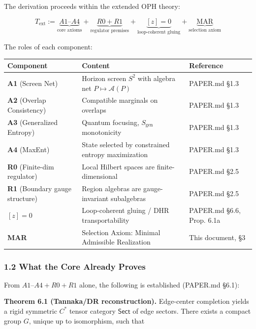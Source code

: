 The derivation proceeds within the extended OPH theory:

\[T_{\mathrm{ext}} := \underbrace{A1\text{–}A4}_{\text{core axioms}} + \underbrace{R0 + R1}_{\text{regulator premises}} + \underbrace{[z]=0}_{\text{loop-coherent gluing}} + \underbrace{\text{MAR}}_{\text{selection axiom}}\]

The roles of each component:

{\def\LTcaptype{none} %
\begin{longtable}[]{@{}lll@{}}
\toprule\noalign{}
Component & Content & Reference \\
\midrule\noalign{}
\endhead
\bottomrule\noalign{}
\endlastfoot
\textbf{A1} (Screen Net) & Horizon screen \(S^2\) with algebra net \(P \mapsto \mathcal{A}(P)\) & PAPER.md §1.3 \\
\textbf{A2} (Overlap Consistency) & Compatible marginals on overlaps & PAPER.md §1.3 \\
\textbf{A3} (Generalized Entropy) & Quantum focusing, \(S_{\mathrm{gen}}\) monotonicity & PAPER.md §1.3 \\
\textbf{A4} (MaxEnt) & State selected by constrained entropy maximization & PAPER.md §1.3 \\
\textbf{R0} (Finite-dim regulator) & Local Hilbert spaces are finite-dimensional & PAPER.md §2.5 \\
\textbf{R1} (Boundary gauge structure) & Region algebras are gauge-invariant subalgebras & PAPER.md §2.5 \\
\textbf{\([z]=0\)} & Loop-coherent gluing / DHR transportability & PAPER.md §6.6, Prop. 6.1a \\
\textbf{MAR} & Selection Axiom: Minimal Admissible Realization & This document, §3 \\
\end{longtable}
}

\subsubsection{1.2 What the Core Already Proves}\label{12-what-the-core-already-proves}

From \(A1\)--\(A4 + R0 + R1\) alone, the following is established (PAPER.md §6.1):

\textbf{Theorem 6.1 (Tannaka/DR reconstruction).} Edge-center completion yields a rigid symmetric \(C^*\) tensor category \(\mathsf{Sect}\) of edge sectors. There exists a compact group \(G\), unique up to isomorphism, such that

